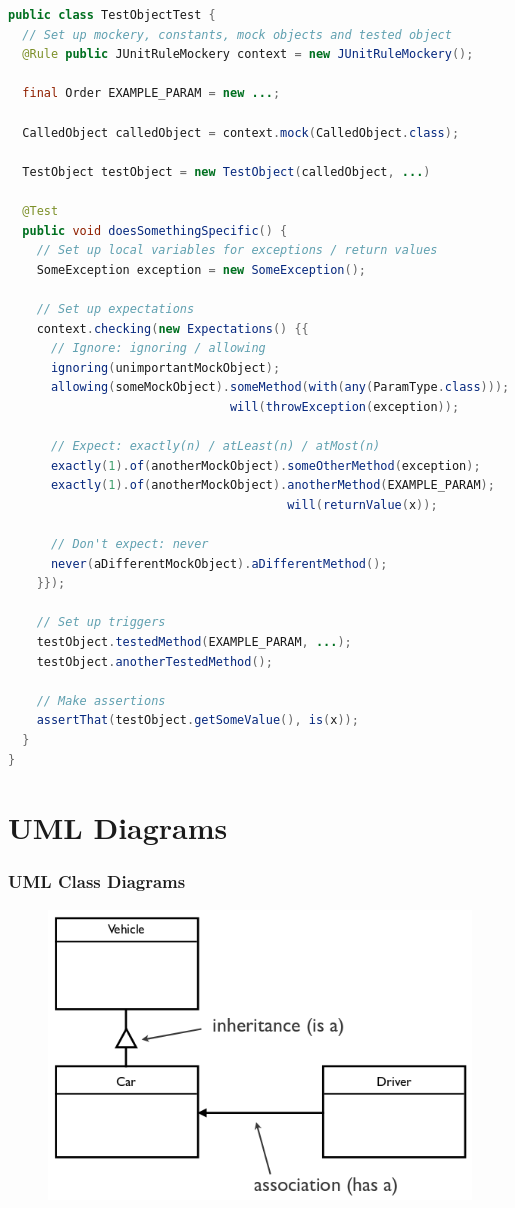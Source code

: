 \documentclass[twocolumn,english]{article}
\begin{document}
\begin{lstlisting}[language=Java,basicstyle={\footnotesize\ttfamily},commentstyle={\color{gray}\itshape}]
public class TestObjectTest {
  // Set up mockery, constants, mock objects and tested object
  @Rule public JUnitRuleMockery context = new JUnitRuleMockery();

  final Order EXAMPLE_PARAM = new ...;

  CalledObject calledObject = context.mock(CalledObject.class);

  TestObject testObject = new TestObject(calledObject, ...)

  @Test
  public void doesSomethingSpecific() {
    // Set up local variables for exceptions / return values
    SomeException exception = new SomeException();

    // Set up expectations
    context.checking(new Expectations() {{
      // Ignore: ignoring / allowing
      ignoring(unimportantMockObject);
      allowing(someMockObject).someMethod(with(any(ParamType.class)));
                               will(throwException(exception));

      // Expect: exactly(n) / atLeast(n) / atMost(n)
      exactly(1).of(anotherMockObject).someOtherMethod(exception);
      exactly(1).of(anotherMockObject).anotherMethod(EXAMPLE_PARAM);
                                       will(returnValue(x));

      // Don't expect: never
      never(aDifferentMockObject).aDifferentMethod();
    }});
    
    // Set up triggers
    testObject.testedMethod(EXAMPLE_PARAM, ...);
    testObject.anotherTestedMethod();

    // Make assertions
    assertThat(testObject.getSomeValue(), is(x));
  }
}
\end{lstlisting}



\section{UML Diagrams}


\subsubsection*{UML Class Diagrams}

\begin{figure}[H]
\centering{}\includegraphics[width=0.33\columnwidth]{img/uml-class} 
\end{figure}
\end{document}
